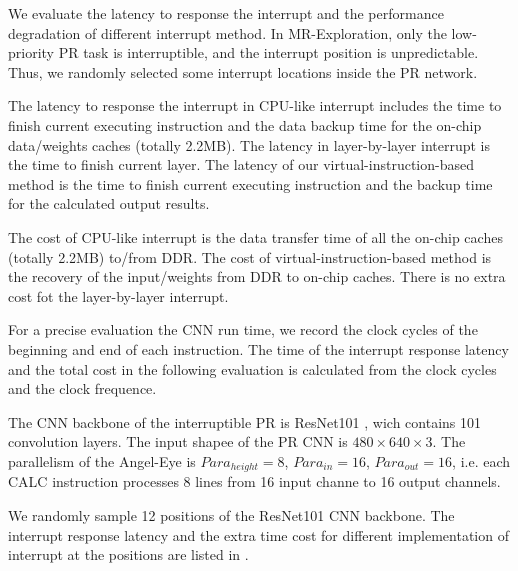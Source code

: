 We evaluate the latency to response the interrupt and the performance degradation of different interrupt method. In MR-Exploration, only the low-priority PR task is interruptible, and the interrupt position is unpredictable. Thus, we randomly selected some interrupt locations inside the PR network.

The latency to response the interrupt in CPU-like interrupt includes the time to finish current executing instruction and the data backup time for the on-chip data/weights caches (totally 2.2MB). The latency in layer-by-layer interrupt is the time to finish current layer. The latency of our virtual-instruction-based method is the time to finish current executing instruction and the backup time for the calculated output results. 

The cost of CPU-like interrupt is the data transfer time of all the on-chip caches (totally 2.2MB) to/from DDR. The cost of virtual-instruction-based method is the recovery of the input/weights from DDR to on-chip caches. There is no extra cost fot the layer-by-layer interrupt.

For a precise evaluation the CNN run time, we record the clock cycles of the beginning and end of each instruction. The time of the interrupt response latency and the total cost in the following evaluation is calculated from the clock cycles and the clock frequence.

The CNN backbone of the interruptible PR is ResNet101 \cite{he2016deep}, wich contains 101 convolution layers. The input shapee of the PR CNN is $480 \times 640 \times 3$. The parallelism of the Angel-Eye is $Para_{height}=8$, $Para_{in}=16$, $Para_{out}=16$, i.e. each CALC instruction processes 8 lines from 16 input channe to 16 output channels. 

We randomly sample 12 positions of the ResNet101 CNN backbone. The interrupt response latency and the extra time cost for different implementation of interrupt at the positions are listed in .




